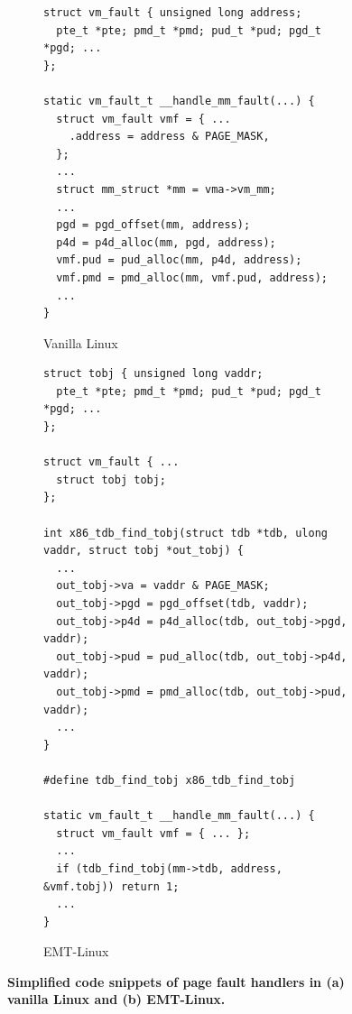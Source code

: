 \begin{figure}[H]
\centering
\begin{subfigure}[b]{.5\textwidth}
\begin{verbatim}
struct vm_fault { unsigned long address;
  pte_t *pte; pmd_t *pmd; pud_t *pud; pgd_t *pgd; ...
};

static vm_fault_t __handle_mm_fault(...) {
  struct vm_fault vmf = { ...
    .address = address & PAGE_MASK,
  };
  ...
  struct mm_struct *mm = vma->vm_mm;
  ...
  pgd = pgd_offset(mm, address);
  p4d = p4d_alloc(mm, pgd, address);
  vmf.pud = pud_alloc(mm, p4d, address);
  vmf.pmd = pmd_alloc(mm, vmf.pud, address);
  ...
}
\end{verbatim}
\captionsetup{justification=centering}
\vspace{-20pt}
\caption{Vanilla Linux}
\label{emt:code:pfh-vanilla}
\vspace{-7.5pt}
\end{subfigure}
\begin{subfigure}[b]{.5\textwidth}
\begin{verbatim}
struct tobj { unsigned long vaddr;
  pte_t *pte; pmd_t *pmd; pud_t *pud; pgd_t *pgd; ...
};

struct vm_fault { ...
  struct tobj tobj;
};

int x86_tdb_find_tobj(struct tdb *tdb, ulong vaddr, struct tobj *out_tobj) {
  ...
  out_tobj->va = vaddr & PAGE_MASK;
  out_tobj->pgd = pgd_offset(tdb, vaddr);
  out_tobj->p4d = p4d_alloc(tdb, out_tobj->pgd, vaddr);
  out_tobj->pud = pud_alloc(tdb, out_tobj->p4d, vaddr);
  out_tobj->pmd = pmd_alloc(tdb, out_tobj->pud, vaddr);
  ...
}

#define tdb_find_tobj x86_tdb_find_tobj

static vm_fault_t __handle_mm_fault(...) {
  struct vm_fault vmf = { ... };
  ...
  if (tdb_find_tobj(mm->tdb, address, &vmf.tobj)) return 1;
  ...
}
\end{verbatim}
\captionsetup{justification=centering}
\vspace{-20pt}
\caption{EMT-Linux} %
\label{emt:code:pfh-emt}
\end{subfigure}

\vspace{-10pt}
\caption{\bf Simplified code snippets of page fault handlers in (a) vanilla Linux and (b) EMT-Linux.}
\label{emt:code:pfh-ve}
\vspace{-5pt}
\end{figure}

